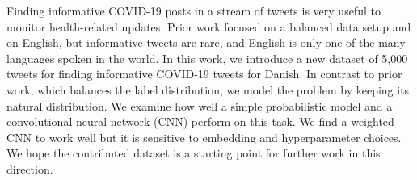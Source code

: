 Finding informative COVID-19 posts in a stream of tweets is very useful to monitor health-related updates. Prior work focused on a balanced data setup and on English, but informative tweets are rare, and English is only one of the many languages spoken in the world. In this work, we introduce a new dataset of 5,000 tweets for finding informative COVID-19 tweets for Danish. In contrast to prior work, which balances the label distribution, we model the problem by keeping its natural distribution. We examine how well a simple probabilistic model and a convolutional neural network (CNN)  perform on this task. We find a weighted CNN to work well but it is sensitive to embedding and hyperparameter choices. We hope the contributed dataset is a starting point for further work in this direction.
